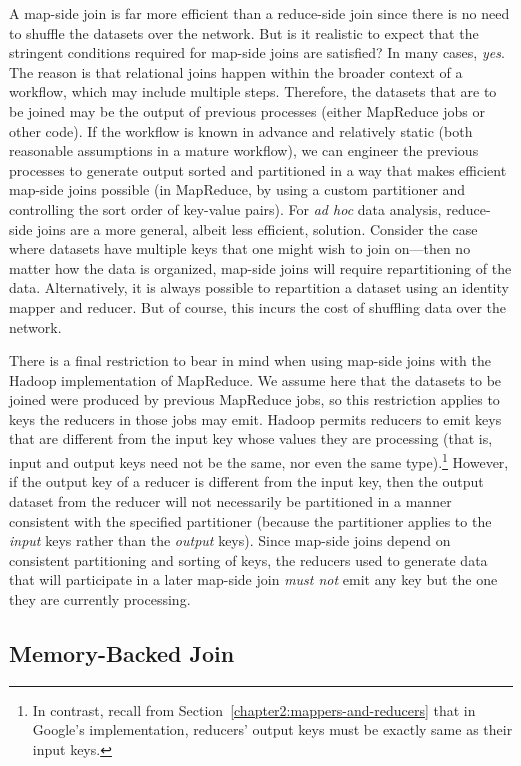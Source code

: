 A map-side join is far more efficient than a reduce-side join since
there is no need to shuffle the datasets over the network.  But is it
realistic to expect that the stringent conditions required for
map-side joins are satisfied?  In many cases, {\it yes}.  The reason
is that relational joins happen within the broader context of a
workflow, which may include multiple steps.  Therefore, the datasets
that are to be joined may be the output of previous processes (either
MapReduce jobs or other code).  If the workflow is known in advance
and relatively static (both reasonable assumptions in a mature
workflow), we can engineer the previous processes to generate
output sorted and partitioned in a way that makes efficient map-side
joins possible (in MapReduce, by using a custom partitioner and
controlling the sort order of key-value pairs).  For {\it ad hoc} data
analysis, reduce-side joins are a more general, albeit less efficient,
solution.  Consider the case where datasets have multiple keys that
one might wish to join on---then no matter how the data is organized,
map-side joins will require repartitioning of the data.
Alternatively, it is always possible to repartition a dataset using an
identity mapper and reducer.  But of course, this incurs the cost of
shuffling data over the network.

There is a final restriction to bear in mind when using map-side joins
with the Hadoop implementation of MapReduce.  We assume here that the
datasets to be joined were produced by previous MapReduce jobs, so
this restriction applies to keys the reducers in those jobs may emit.
Hadoop permits reducers to emit keys that are different from the
input key whose values they are processing (that is, input and output
keys need not be the same, nor even the same type).\footnote{In
  contrast, recall from Section~\ref{chapter2:mappers-and-reducers}
  that in Google's implementation, reducers' output keys must be
  exactly same as their input keys.}  However, if the output key of a
reducer is different from the input key, then the output dataset from
the reducer will not necessarily be partitioned in a manner consistent
with the specified partitioner (because the partitioner applies to the
\emph{input} keys rather than the \emph{output} keys).  Since map-side
joins depend on consistent partitioning and sorting of keys, the
reducers used to generate data that will participate in a later
map-side join \emph{must not} emit any key but the one they are
currently processing.

\subsection{Memory-Backed Join}

